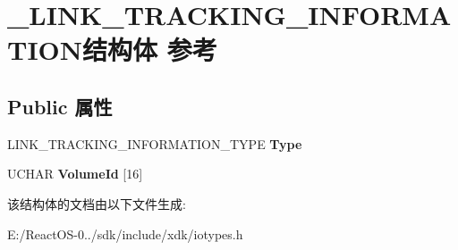 \hypertarget{struct___l_i_n_k___t_r_a_c_k_i_n_g___i_n_f_o_r_m_a_t_i_o_n}{}\section{\+\_\+\+L\+I\+N\+K\+\_\+\+T\+R\+A\+C\+K\+I\+N\+G\+\_\+\+I\+N\+F\+O\+R\+M\+A\+T\+I\+O\+N结构体 参考}
\label{struct___l_i_n_k___t_r_a_c_k_i_n_g___i_n_f_o_r_m_a_t_i_o_n}
\subsection*{Public 属性}
\begin{DoxyCompactItemize}
\item 
\mbox{\label{struct___l_i_n_k___t_r_a_c_k_i_n_g___i_n_f_o_r_m_a_t_i_o_n_a47891de18cb5e2b980cfff1af83d33eb}} 
L\+I\+N\+K\+\_\+\+T\+R\+A\+C\+K\+I\+N\+G\+\_\+\+I\+N\+F\+O\+R\+M\+A\+T\+I\+O\+N\+\_\+\+T\+Y\+PE {\bfseries Type}
\item 
\mbox{\label{struct___l_i_n_k___t_r_a_c_k_i_n_g___i_n_f_o_r_m_a_t_i_o_n_acc583406cdcd2675567b449f51523db6}} 
U\+C\+H\+AR {\bfseries Volume\+Id} \mbox{[}16\mbox{]}
\end{DoxyCompactItemize}


该结构体的文档由以下文件生成\+:\begin{DoxyCompactItemize}
\item 
E\+:/\+React\+O\+S-\/0../sdk/include/xdk/iotypes.\+h\end{DoxyCompactItemize}
